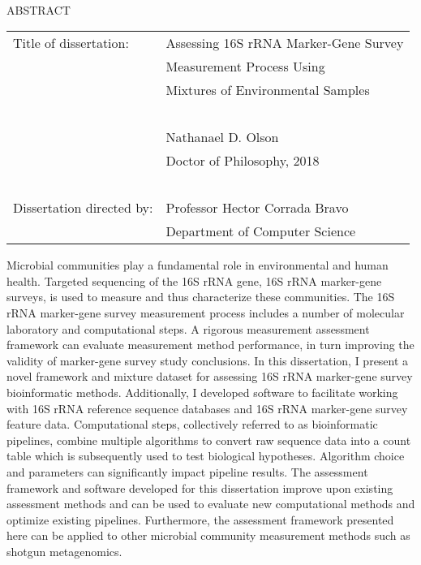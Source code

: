
\hbox{\ }

\renewcommand{\baselinestretch}{1}
\small \normalsize

\begin{center}
\large{{ABSTRACT}}

\vspace{3em}

\end{center}
\hspace{-.15in}
\begin{tabular}{ll}
Title of dissertation:    & {\large  Assessing 16S rRNA Marker-Gene Survey}\\
&                     {\large  Measurement Process Using} \\
&                     {\large  Mixtures of Environmental Samples} \\
\ \\
&                          {\large  Nathanael D. Olson} \\
&                           {\large Doctor of Philosophy, 2018} \\
\ \\
Dissertation directed by: & {\large  Professor Hector Corrada Bravo} \\
&               {\large  Department of Computer Science } \\
\end{tabular}

\vspace{3em}

\renewcommand{\baselinestretch}{2}
\large \normalsize

Microbial communities play a fundamental role in environmental and human health.
Targeted sequencing of the 16S rRNA gene, 16S rRNA marker-gene surveys, is used to measure and thus characterize these communities.
The 16S rRNA marker-gene survey measurement process includes a number of molecular laboratory and computational steps.
A rigorous measurement assessment framework can evaluate measurement method performance, in turn improving the validity of marker-gene survey study conclusions.
In this dissertation, I present a novel framework and mixture dataset for assessing 16S rRNA marker-gene survey bioinformatic methods.
Additionally, I developed software to facilitate working with 16S rRNA reference sequence databases and 16S rRNA marker-gene survey feature data.
Computational steps, collectively referred to as bioinformatic pipelines, combine multiple algorithms to convert raw sequence data into a count table which is subsequently used to test biological hypotheses.
Algorithm choice and parameters can significantly impact pipeline results.
The assessment framework and software developed for this dissertation improve upon existing assessment methods and can be used to evaluate new computational methods and optimize existing pipelines.
Furthermore, the assessment framework presented here can be applied to other microbial community measurement methods such as shotgun metagenomics.

